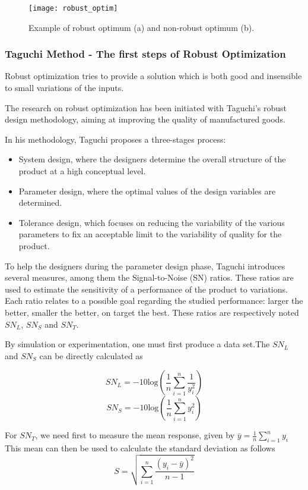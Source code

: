 \begin{figure}
\centering
\texttt{[image: robust\_optim]}
\caption{Example of robust optimum (a) and non-robust optimum (b).}\label{robust_optim_illu}
\end{figure}

\subsubsection{Taguchi Method - The first steps of Robust Optimization }

Robust optimization tries to provide a solution which is both good and insensible to small variations of the inputs.

The research on robust optimization has been initiated with Taguchi's robust design methodology\cite{tsui1992overview}, aiming at improving the quality of manufactured goods.

In his methodology, Taguchi proposes a three-stages process:
\begin{itemize}
\item System design, where the designers determine the overall structure of the product at a high conceptual level.
\item Parameter design, where the optimal values of the design variables are determined.
\item Tolerance design, which focuses on reducing the variability of the various parameters to fix an acceptable limit to the variability of quality for the product.
\end{itemize}

To help the designers during the parameter design phase, Taguchi introduces several measures, among them the Signal-to-Noise (SN) ratios. These ratios are used to estimate the sensitivity of a performance of the product to variations. Each ratio relates to a possible goal regarding the studied performance: larger the better, smaller the better, on target the best. These ratios are respectively noted $SN_L$, $SN_S$ and $SN_T$.

By simulation or experimentation, one must first produce a data set.The $SN_L$ and $SN_S$ can be directly calculated as

$$SN_L = -10\text{log}\left( \frac{1}{n} \sum_{i=1}^n \frac{1}{y_i^2} \right)$$
$$SN_S = -10\text{log}\left( \frac{1}{n} \sum_{i=1}^n y_i^2 \right)$$

For $SN_T$, we need first to measure the mean response, given by $\bar{y} = \frac{1}{n}\displaystyle\sum_{i=1}^n y_i$
This mean can then be used to calculate the standard deviation as follows
$$S = \sqrt{\sum_{i=1}^n \frac{(y_i - \bar{y})^2}{n-1}}$$

